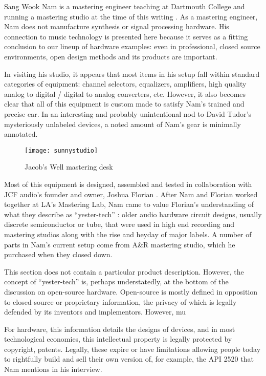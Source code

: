 Sang Wook Nam is a mastering engineer teaching at Dartmouth College and running a mastering studio at the time of this writing \cite{nam2015}. As a mastering engineer, Nam does not manufacture synthesis or signal processing hardware. His connection to music technology is presented here because it serves as a fitting conclusion to our lineup of hardware examples: even in professional, closed source environments, open design methods and its products are important. 

In visiting his studio, it appears that most items in his setup fall within standard categories of equipment: channel selectors, equalizers, amplifiers, high quality analog to digital / digital to analog converters, etc. However, it also becomes clear that all of this equipment is custom made to satisfy Nam's trained and precise ear. In an interesting and probably unintentional nod to David Tudor's mysteriously unlabeled devices, a noted amount of Nam's gear is minimally annotated. 

	\begin{figure}[h!]
	  \caption{Jacob's Well mastering desk}
	  \centering
	    \texttt{[image: sunnystudio]}
	\end{figure}
	
Most of this equipment is designed, assembled and tested in collaboration with JCF audio's founder and owner, Joshua Florian \cite{florian2015}. After Nam and Florian worked together at LA's Mastering Lab, Nam came to value Florian's understanding of what they describe as ``yester-tech'' \cite{florian2015b}: older audio hardware circuit designs, usually discrete semiconductor or tube, that were used in high end recording and mastering studios along with the rise and heyday of major labels. A number of parts in Nam's current setup come from A\&R mastering studio, which he purchased when they closed down. 



This section does not contain a particular product description. However, the concept of ``yester-tech'' is, perhaps understatedly, at the bottom of the discussion on open-source hardware. Open-source is mostly defined in opposition to closed-source or proprietary information, the privacy of which is legally defended by its inventors and implementors. However, mu

For hardware, this information details the designs of devices, and in most technological economies, this intellectual property is legally protected by copyright, patents. Legally, these expire or have limitations allowing people today to rightfully build and sell their own version of, for example, the API 2520 that Nam mentions in his interview. 

